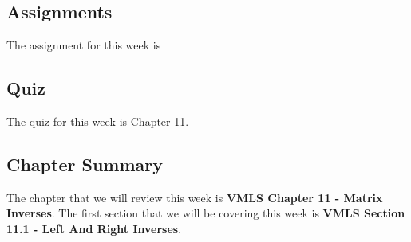 \subsection{Assignments}

The assignment for this week is   

\subsection{Quiz}

The quiz for this week is \href{https://applied.cs.colorado.edu/mod/quiz/view.php?id=50812}{Chapter 11.}  

\subsection{Chapter Summary}

The chapter that we will review this week is \textbf{VMLS Chapter 11 - Matrix Inverses}. The first section that we will be covering this week is \textbf{VMLS Section 11.1 - Left And Right Inverses}.

